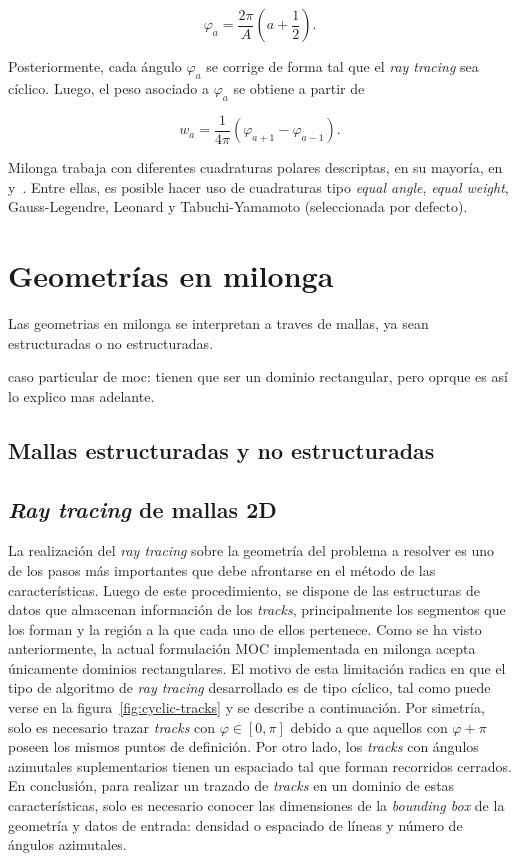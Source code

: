 \documentclass[11pt]{article}
\numberwithin{equation}{section}
\begin{document}
\begin{equation}
 \varphi_a = \frac{2\pi}{A} \left( a + \frac{1}{2} \right).
\end{equation}

\noindent
Posteriormente, cada ángulo $\varphi_a$ se corrige de forma tal que el \emph{ray tracing} sea cíclico. Luego, el peso asociado a $\varphi_a$ se obtiene a partir de

\begin{equation}
 w_a = \frac{1}{4\pi} \left( \varphi_{a+1} - \varphi_{a-1} \right).
\end{equation}

Milonga trabaja con diferentes cuadraturas polares descriptas, en su mayoría, en~\cite{handbook-ingnuclear} y~\cite{tabuchi}. Entre ellas, es posible hacer uso de cuadraturas tipo \emph{equal angle}, \emph{equal weight}, Gauss-Legendre, Leonard y Tabuchi-Yamamoto (seleccionada por defecto).

\section{Geometr\'ias en milonga}

Las geometrias en milonga se interpretan a traves de mallas, ya sean estructuradas o no estructuradas. 

caso particular de moc: tienen que ser un dominio rectangular, pero oprque es así lo explico mas adelante.

\subsection{Mallas estructuradas y no estructuradas}

\subsection{\emph{Ray tracing} de mallas 2D} \label{sec:ray-tracing}

La realizaci\'on del \emph{ray tracing} sobre la geometría del problema a resolver es uno de los pasos más importantes que debe afrontarse en el método de las características. Luego de este procedimiento, se dispone de las estructuras de datos que almacenan información de los \emph{tracks}, principalmente los segmentos que los forman y la región a la que cada uno de ellos pertenece. Como se ha visto anteriormente, la actual formulación MOC implementada en milonga acepta únicamente dominios rectangulares. El motivo de esta limitación radica en que el tipo de algoritmo de \emph{ray tracing} desarrollado es de tipo c\'iclico, tal como puede verse en la figura~\ref{fig:cyclic-tracks} y se describe a continuación. Por simetr\'ia, solo es necesario trazar \emph{tracks} con $\varphi \in \left[ 0, \pi \right]$ debido a que aquellos con $\varphi + \pi$ poseen los mismos puntos de definición. Por otro lado, los \emph{tracks} con ángulos azimutales suplementarios tienen un espaciado tal que forman recorridos cerrados. En conclusión, para realizar un trazado de \emph{tracks} en un dominio de estas características, solo es necesario conocer las dimensiones de la \emph{bounding box} de la geometría y datos de entrada: densidad o espaciado de líneas y número de ángulos azimutales.
\end{document}
